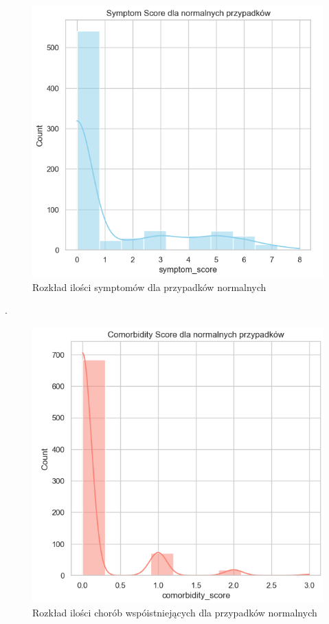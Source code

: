 \documentclass[a4paper,fleqn]{cas-dc}
\begin{document}
\begin{figure}[h]
	\includegraphics[scale=.60]{wykresy/wykres3.1.png}
	\caption{Rozkład ilości symptomów dla przypadków normalnych}
	\label{FIG:1}
\end{figure}
\newpage
.
\newpage
\begin{figure}[h]
	\includegraphics[scale=.53]{wykresy/wykres3.2.png}
	\caption{Rozkład ilości chorób wspóistniejących dla przypadków normalnych}
	\label{FIG:1}
\end{figure}
\end{document}
